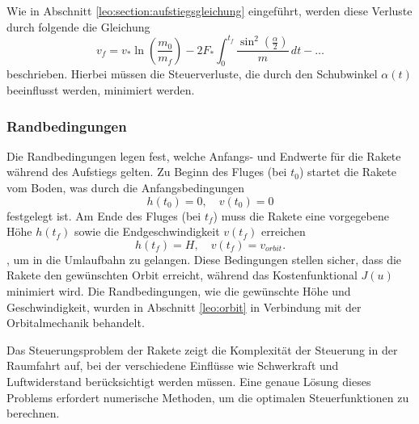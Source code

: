 Wie in Abschnitt \ref{leo:section:aufstiegsgleichung} eingeführt, werden diese Verluste durch folgende die Gleichung
\[
v_f = v_* \ln \left(\frac{m_0}{m_f}\right) - 2F_* \int_0^{t_f} \frac{\sin^2\left(\frac{\alpha}{2}\right)}{m} \, dt - \dots
\]
beschrieben. Hierbei müssen die Steuerverluste, die durch den Schubwinkel \( \alpha(t) \) beeinflusst werden, minimiert werden.

\subsubsection{Randbedingungen}
Die Randbedingungen legen fest, welche Anfangs- und Endwerte für die Rakete während des Aufstiegs gelten. Zu Beginn des Fluges (bei \( t_0 \)) startet die Rakete vom Boden, was durch die Anfangsbedingungen
\[
h(t_0) = 0, \quad v(t_0) = 0
\]
festgelegt ist. Am Ende des Fluges (bei \( t_f \)) muss die Rakete eine vorgegebene Höhe \( h(t_f) \) sowie die Endgeschwindigkeit \( v(t_f) \) erreichen
\[
h(t_f) = H, \quad v(t_f) = v_{orbit}.
\],
um in die Umlaufbahn zu gelangen.
Diese Bedingungen stellen sicher, dass die Rakete den gewünschten Orbit erreicht, während das Kostenfunktional \( J(u) \) minimiert wird.
Die Randbedingungen, wie die gewünschte Höhe und Geschwindigkeit, wurden in Abschnitt \ref{leo:orbit} in Verbindung mit der Orbitalmechanik behandelt.

Das Steuerungsproblem der Rakete zeigt die Komplexität der Steuerung in der Raumfahrt auf, bei der verschiedene Einflüsse wie Schwerkraft und Luftwiderstand berücksichtigt werden müssen. Eine genaue Lösung dieses Problems erfordert numerische Methoden, um die optimalen Steuerfunktionen zu berechnen.
